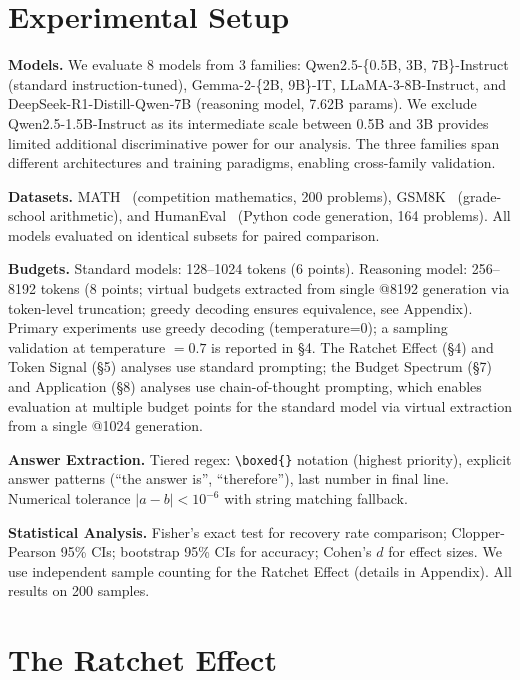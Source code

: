 \documentclass{article}
\begin{document}
\section{Experimental Setup}

\textbf{Models.}
We evaluate 8 models from 3 families: Qwen2.5-\{0.5B, 3B, 7B\}-Instruct (standard instruction-tuned), Gemma-2-\{2B, 9B\}-IT, LLaMA-3-8B-Instruct, and DeepSeek-R1-Distill-Qwen-7B (reasoning model, 7.62B params). We exclude Qwen2.5-1.5B-Instruct as its intermediate scale between 0.5B and 3B provides limited additional discriminative power for our analysis. The three families span different architectures and training paradigms, enabling cross-family validation.

\textbf{Datasets.}
MATH~\cite{hendrycks2021math} (competition mathematics, 200 problems), GSM8K~\cite{cobbe2021gsm8k} (grade-school arithmetic), and HumanEval~\cite{humaneval2021} (Python code generation, 164 problems). All models evaluated on identical subsets for paired comparison.

\textbf{Budgets.}
Standard models: 128--1024 tokens (6 points). Reasoning model: 256--8192 tokens (8 points; virtual budgets extracted from single @8192 generation via token-level truncation; greedy decoding ensures equivalence, see Appendix). Primary experiments use greedy decoding (temperature=0); a sampling validation at temperature $= 0.7$ is reported in \S4. The Ratchet Effect (\S4) and Token Signal (\S5) analyses use standard prompting; the Budget Spectrum (\S7) and Application (\S8) analyses use chain-of-thought prompting, which enables evaluation at multiple budget points for the standard model via virtual extraction from a single @1024 generation.

\textbf{Answer Extraction.}
Tiered regex: \texttt{\textbackslash boxed\{\}} notation (highest priority), explicit answer patterns (``the answer is'', ``therefore''), last number in final line. Numerical tolerance $|a-b| < 10^{-6}$ with string matching fallback.

\textbf{Statistical Analysis.}
Fisher's exact test for recovery rate comparison; Clopper-Pearson 95\% CIs; bootstrap 95\% CIs for accuracy; Cohen's $d$ for effect sizes. We use independent sample counting for the Ratchet Effect (details in Appendix). All results on 200 samples.

\section{The Ratchet Effect}
\end{document}

